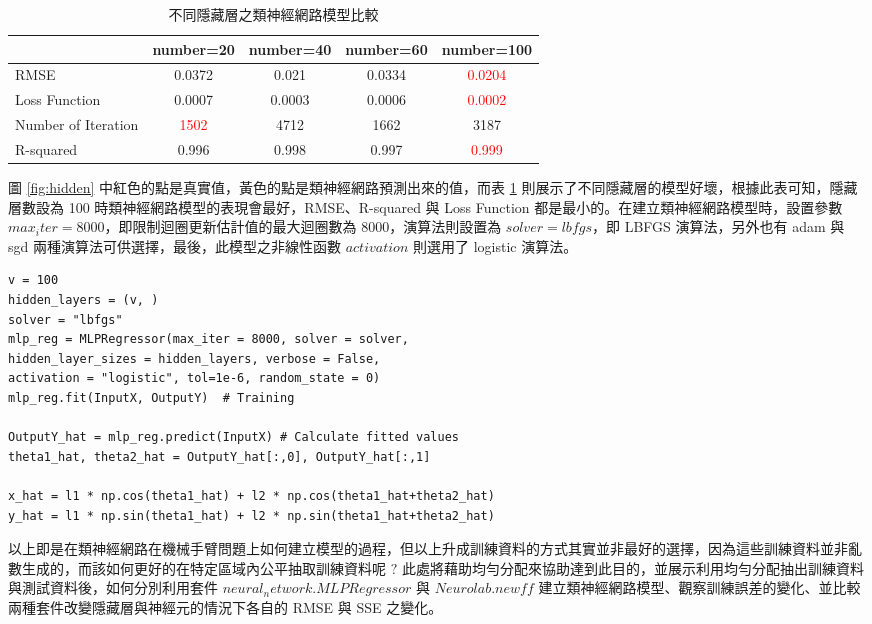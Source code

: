 \begin{itemize}
\begin{table}[h] 
  \centering
  \caption{不同隱藏層之類神經網路模型比較}\label{tb:hidden}
  \extrarowheight=6pt   %
  \begin{tabular}{lcccc}  %
  \hline
    & number=20 & number=40 & number=60 & number=100  \\\hline
   RMSE & 0.0372 & 0.021 & 0.0334 & \textcolor{red}{0.0204}  \\
   Loss Function & 0.0007 & 0.0003 & 0.0006 & \textcolor{red}{0.0002}\\
   Number of Iteration & \textcolor{red}{1502} & 4712 & 1662 & 3187 \\
   R-squared & 0.996 & 0.998 & 0.997 & \textcolor{red}{0.999}  \\\hline
  \end{tabular}
\end{table}

圖 \ref{fig:hidden} 中紅色的點是真實值，黃色的點是類神經網路預測出來的值，而表 \ref{tb:hidden} 則展示了不同隱藏層的模型好壞，根據此表可知，隱藏層數設為 100 時類神經網路模型的表現會最好，RMSE、R-squared 與 Loss Function 都是最小的。在建立類神經網路模型時，設置參數 $max_iter=8000$，即限制迴圈更新估計值的最大迴圈數為 8000，演算法則設置為 $solver=lbfgs$，即 LBFGS 演算法，另外也有 adam 與 sgd 兩種演算法可供選擇，最後，此模型之非線性函數 $activation$ 則選用了 logistic 演算法。

\bigskip
\begin{lstlisting}
v = 100
hidden_layers = (v, ) 
solver = "lbfgs" 
mlp_reg = MLPRegressor(max_iter = 8000, solver = solver, 
hidden_layer_sizes = hidden_layers, verbose = False,
activation = "logistic", tol=1e-6, random_state = 0) 
mlp_reg.fit(InputX, OutputY)  # Training

OutputY_hat = mlp_reg.predict(InputX) # Calculate fitted values
theta1_hat, theta2_hat = OutputY_hat[:,0], OutputY_hat[:,1]

x_hat = l1 * np.cos(theta1_hat) + l2 * np.cos(theta1_hat+theta2_hat)
y_hat = l1 * np.sin(theta1_hat) + l2 * np.sin(theta1_hat+theta2_hat)
\end{lstlisting}

\end{itemize}

以上即是在類神經網路在機械手臂問題上如何建立模型的過程，但以上升成訓練資料的方式其實並非最好的選擇，因為這些訓練資料並非亂數生成的，而該如何更好的在特定區域內公平抽取訓練資料呢 $?$ 此處將藉助均勻分配來協助達到此目的，並展示利用均勻分配抽出訓練資料與測試資料後，如何分別利用套件 $neural_network.MLPRegressor$ 與 $Neurolab.newff$ 建立類神經網路模型、觀察訓練誤差的變化、並比較兩種套件改變隱藏層與神經元的情況下各自的 RMSE 與 SSE 之變化。

